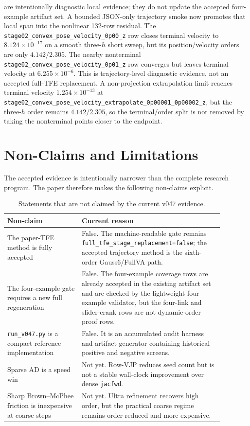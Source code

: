 \documentclass[11pt]{article}
\newcommand{\method}{Gauss6/FullVA}
\newcommand{\tfe}{TFE}
\newcommand{\artifact}[1]{\texttt{#1}}
\begin{document}
are intentionally diagnostic local evidence; they do not update the accepted
four-example artifact set.
A bounded JSON-only trajectory smoke now promotes that local span into the
nonlinear 132-row residual.  The \nolinkurl{stage02_convex_pose_velocity_0p00_z}
row closes terminal velocity to $8.124\times10^{-17}$ on a smooth three-$h$
short sweep, but its position/velocity orders are only $4.142/2.305$.  The
nearby nonterminal \nolinkurl{stage02_convex_pose_velocity_0p01_z} row
converges but leaves terminal velocity at $6.255\times10^{-6}$.  This is
trajectory-level diagnostic evidence, not an accepted full-\tfe{} replacement.
A non-projection extrapolation limit reaches terminal velocity
$1.254\times10^{-13}$ at
\nolinkurl{stage02_convex_pose_velocity_extrapolate_0p00001_0p00002_z}, but
the three-$h$ order remains $4.142/2.305$, so the terminal/order split is not
removed by taking the nonterminal points closer to the endpoint.

\section{Non-Claims and Limitations}

The accepted evidence is intentionally narrower than the complete research
program.  The paper therefore makes the following non-claims explicit.

\begin{table}[t]
\centering
\caption{Statements that are not claimed by the current v047 evidence.}
\label{tab:nonclaims}
\begin{tabular}{P{0.30\linewidth}P{0.58\linewidth}}
\toprule
Non-claim & Current reason \\
\midrule
The paper-\tfe{} method is fully accepted &
False.  The machine-readable gate remains
\nolinkurl{full_tfe_stage_replacement=false}; the accepted trajectory method
is the sixth-order \method{} path. \\
The four-example gate requires a new full regeneration &
False.  The four-example coverage rows are already accepted in the existing
artifact set and are checked by the lightweight four-example validator, but
the four-link and slider-crank rows are not dynamic-order proof rows. \\
\artifact{run\_v047.py} is a compact reference implementation &
False.  It is an accumulated audit harness and artifact generator containing
historical positive and negative screens. \\
Sparse AD is a speed win &
Not yet.  Row-VJP reduces seed count but is not a stable wall-clock
improvement over dense \texttt{jacfwd}. \\
Sharp Brown--McPhee friction is inexpensive at coarse steps &
Not yet.  Ultra refinement recovers high order, but the practical coarse
regime remains order-reduced and more expensive. \\
\bottomrule
\end{tabular}
\end{table}
\end{document}
